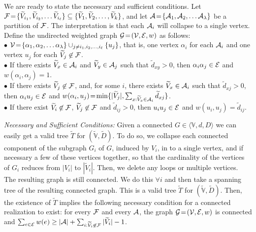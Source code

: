 \documentclass[12pt,a4paper]{article}
\theoremstyle{definition}
\theoremstyle{plain}
\begin{document}
We are ready to state the necessary and sufficient conditions. 
Let ${\cal F} \! = \! \{ \widetilde{V}_{{i_1}}, \widetilde{V}_{{i_2}},
\ldots \widetilde{V}_{{i_{\ell}}} \} \subseteq
\{ \widetilde{V}_{1}, \widetilde{V}_{2}, \ldots , \widetilde{V}_{k}  \}$,
and let
${\cal A} \! = \! \{ {\cal A}_1,  {\cal A}_2, \ldots  {\cal A}_{\lambda} \}$
be a partition of ${\cal F}$. The interpretation is that each ${\cal A}_i$ will collapse to a single vertex.
Define the undirected weighted graph
${\cal G} \! = \! ({\cal V},{\cal E},w)$ as follows:\\
$\bullet$ ${\cal V} \! = \! \{ \alpha_1, \alpha_2, \ldots  \alpha_{\lambda} \}
          \cup_{j \neq i_1,i_2, \ldots , i_{\ell}} \{ u_j \}$,
that is, one vertex $\alpha_i$ for each ${\cal A}_i$ and one vertex $u_j$ for each
                   $\widetilde{V}_{j} \not\in {\cal F}$.\\
$\bullet$ If there exists $\widetilde{V}_{x} \in {\cal A}_i$
and $\widetilde{V}_{y} \in {\cal A}_j$ such that $\widetilde{d}_{{xy}} > 0$, then
$\alpha_i\alpha_j \in {\cal E}$ and
$w(\alpha_i , \alpha_j ) \! = \! 1$.  \\
$\bullet$ If there exists $\widetilde{V}_{j} \not\in {\cal F}$,
and, for some $i$, there exists $\widetilde{V}_{x} \in {\cal A}_i$
such that $\widetilde{d}_{{xj}} > 0$, then $\alpha_i u_j \in {\cal E}$
and $w ( \alpha_i , u_j ) \! = \! \min \{ |\widetilde{V}_{j}|,
         \sum_{x : \widetilde{V}_{x} \in {\cal A}_i} \widetilde{d}_{{xj}} \}$.  \\
$\bullet$ If there exist $\widetilde{V}_{i} \not\in {\cal F}$,
$\widetilde{V}_{j} \not\in {\cal F}$ and $\widetilde{d}_{{ij}} > 0$,
then $u_i u_j \in {\cal E}$ and
$w ( u_i , u_j ) \! = \! \widetilde{d}_{{ij}}$.\smallskip

\noindent
{\it Necessary  and Sufficient Conditions:}
Given a connected $G\in \langle \mathbb V, d, D \rangle$ we can easily get a valid
tree  $\widetilde{T}$ for $(\widetilde{\mathbb V},\widetilde{D})$.
To do so, we collapse each connected component of the subgraph $G_i$ of $G$, induced
by $V_i$, in to a single vertex, and if necessary a few of these vertices together, 
so that the cardinality of the vertices of $G_i$ reduces from $|V_i|$ to $|\widetilde{V}_i|$. 
Then, we delete any loops or multiple vertices. The resulting graph is still connected. We do this 
$\forall i$ and then take a spanning tree of the resulting connected graph. This is a valid
tree  $\widetilde{T}$ for $(\widetilde{\mathbb V},\widetilde{D})$.
Then, the existence of
$\widetilde{T}$ implies 
the following necessary condition for a connected realization to exist:
for every ${\cal F}$ and every ${\cal A}$,
the graph ${\cal G} \! = \! ({\cal V},{\cal E},w)$ is connected
and $\sum_{e\in{\cal E}} w(e) \geq |{\cal A}| +
\sum_{i: \widetilde{V}_{i} \not\in {\cal F}} |\widetilde{V}_{i}| -1 $.
\end{document}
